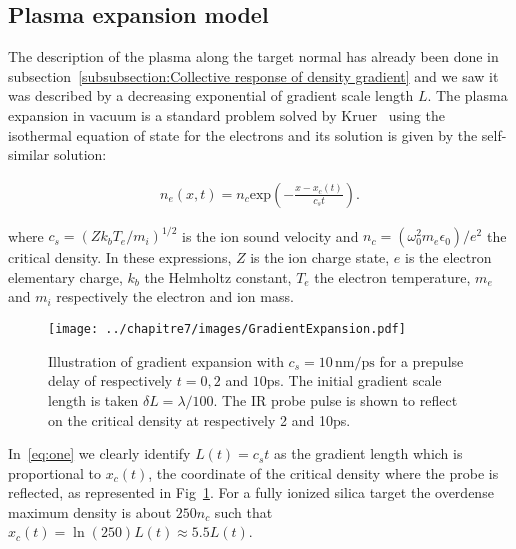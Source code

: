 

\subsection{Plasma expansion model}\label{subsubsection:Plasma exansion model}

 The description of the plasma along the target normal has already been done in subsection~\ref{subsubsection:Collective response of density gradient} and we saw it was described by a decreasing exponential of gradient scale length $L$. The plasma expansion in vacuum is a standard problem solved by Kruer~\cite{kruer1988physics} using the isothermal equation of state for the electrons  and its solution is given by the self-similar solution:

\begin{align}
n_e(x,t) = n_{c}\mathrm{exp}(-\frac{x-x_c(t)}{c_s t})
\label{eq:one}.
\end{align}

\noindent where $c_s= (Zk_bT_e/m_i)^{1/2}$ is the ion sound velocity and $n_c = (\omega_0^2m_e\epsilon_0)/e^2$  the critical density. In these expressions, $Z$ is the ion charge state, $e$ is the electron elementary charge, $k_b$ the Helmholtz constant, $T_e$ the electron temperature, $m_e$ and $m_i$ respectively the electron and ion mass. 

\begin{figure}[H]
\centering
\texttt{[image: ../chapitre7/images/GradientExpansion.pdf]}\\
\caption{\label{fig:GradientExpansion}Illustration of gradient expansion with $c_s = 10\,\mathrm{nm/ps}$ for a prepulse delay of respectively $t = 0,2$ and $10$ps. The initial gradient scale length is taken $\delta L = \lambda / 100$. The IR probe pulse is shown to reflect 
on the critical density at respectively 2 and 10ps.}
\end{figure}



\noindent In~\ref{eq:one} we clearly identify $L(t) = c_s t$ as the gradient length which is proportional to $x_c(t)$, the coordinate of the critical density where the probe is reflected, as represented in Fig~\ref{fig:GradientExpansion}. For a fully ionized silica target the overdense maximum density is about $250n_c$ such that $x_c(t) = \ln(250)L(t) \approx 5.5 L(t)$. 

